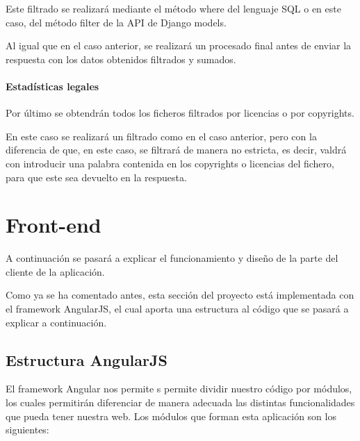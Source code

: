 \documentclass[a4paper, spanish, 12pt]{book}
\begin{document}
Este filtrado se realizar\'a mediante el m\'etodo where del lenguaje SQL o en este
caso, del m\'etodo filter de la API de Django models.

Al igual que en el caso anterior, se realizar\'a un procesado final antes de enviar
la respuesta con los datos obtenidos filtrados y sumados.

\paragraph*{Estad\'isticas legales}
\label{paragraph:legal_stats}

Por \'ultimo se obtendr\'an todos los ficheros filtrados por licencias o por
copyrights.

En este caso se realizar\'a un filtrado como en el caso anterior, pero con la
diferencia de que, en este caso, se filtrar\'a de manera no estricta, es decir,
valdr\'a con introducir una palabra contenida en los copyrights o licencias del fichero,
para que este sea devuelto en la respuesta.

\section{Front-end}
\label{sec:front-end}

A continuaci\'on se pasar\'a a explicar el funcionamiento y dise\~no de la parte
del cliente de la aplicaci\'on.

Como ya se ha comentado antes, esta secci\'on del proyecto est\'a implementada
con el framework AngularJS, el cual aporta una estructura al c\'odigo que se
pasar\'a a explicar a continuaci\'on.

\subsection{Estructura AngularJS}
\label{subsec:angular_structure}

El framework Angular nos permite s permite dividir nuestro c\'odigo por m\'odulos, los
cuales permitir\'an diferenciar de manera adecuada las distintas funcionalidades
que pueda tener nuestra web. Los m\'odulos que forman esta aplicaci\'on son los
siguientes:
\end{document}
